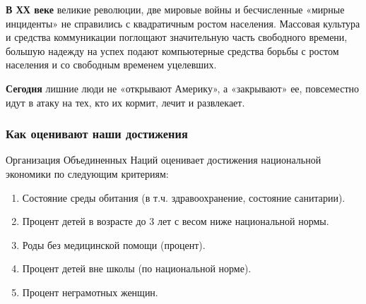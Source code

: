 \textbf{В ХХ веке} великие революции, две мировые войны и бесчисленные «мирные инциденты» не справились с квадратичным
ростом населения. Массовая культура и средства коммуникации поглощают значительную часть свободного времени, большую
надежду на успех подают компьютерные средства борьбы с ростом населения и со свободным временем уцелевших.


\textbf{Сегодня} лишние люди не «открывают Америку», а «закрывают» ее, повсеместно идут в атаку на тех, кто их кормит,
лечит и развлекает.

\subsubsection[Как оценивают наши достижения]{Как оценивают наши достижения}

Организация Объединенных Наций оценивает достижения национальной экономики по следующим критериям:

\begin{enumerate}
\item Состояние среды обитания (в т.ч. здравоохранение, состояние санитарии).
\item Процент детей в возрасте до 3 лет с весом ниже национальной нормы.
\item Роды без медицинской помощи (процент).
\item Процент детей вне школы (по национальной норме).
\item Процент неграмотных женщин.
\end{enumerate}
%
